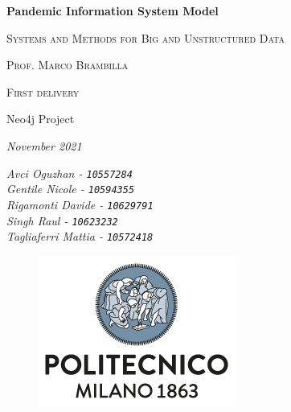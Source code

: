 \documentclass[12pt, a4paper]{article}
\begin{document}

\begin{titlepage}
    \centering
    {\Huge\bfseries Pandemic Information System Model\par} %
    \vspace{1.5cm}
    {\scshape\large Systems and Methods for Big and Unstructured Data \par} %
    \vspace{0.5cm}
    {\scshape\large Prof. Marco Brambilla \par} %
    \vspace{1cm}
    {\scshape\large %
        First delivery \par 
        Neo4j Project \par 
    }
    \vspace{0.5cm}
    {\slshape\large November 2021 \par} %
    \vspace{1cm}
    \linespread{0.8} %
    {\large\itshape %
        Avci Oguzhan - \texttt{10557284}\\
        Gentile Nicole - \texttt{10594355}\\
        Rigamonti Davide - \texttt{10629791}\\
        Singh Raul - \texttt{10623232}\\
        Tagliaferri Mattia - \texttt{10572418}
    }
    \vfill
    \begin{figure}[b]
        \includegraphics[scale=0.6]{polimi.png} %
        \centering
    \end{figure}


\end{titlepage}

\end{document}
